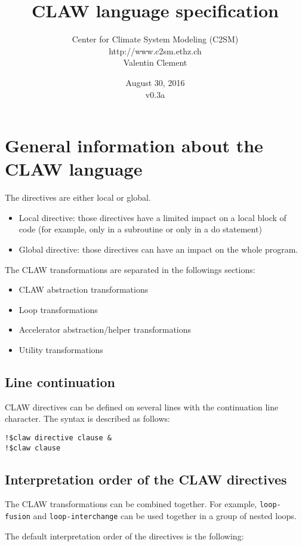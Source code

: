 \documentclass{article}
\title{CLAW language specification}
\author{Center for Climate System Modeling (C2SM)\\http://www.c2sm.ethz.ch\\Valentin Clement}
\date{August 30, 2016\\\vspace{1em}v0.3a}
\begin{document}
\maketitle


\tableofcontents

\section{General information about the CLAW language}
The directives are either local or global.

\begin{itemize}
\item Local directive: those directives have a limited impact on a local block of
code (for example, only in a subroutine or only in a do statement)
\item Global directive: those directives can have an impact on the whole
program.
\end{itemize}

The CLAW transformations are separated in the followings sections:
\begin{itemize}
\item CLAW abstraction transformations
\item Loop transformations
\item Accelerator abstraction/helper transformations
\item Utility transformations
\end{itemize}

\subsection{Line continuation}
CLAW directives can be defined on several lines with the continuation line character. The syntax is described as follows:

\begin{lstlisting}
!$claw directive clause &
!$claw clause
\end{lstlisting}


\subsection{Interpretation order of the CLAW directives}
The CLAW transformations can be combined together. For example, \lstinline!loop-fusion! and \lstinline!loop-interchange! can be used together in a group of nested loops.

The default interpretation order of the directives is the following:
\end{document}
